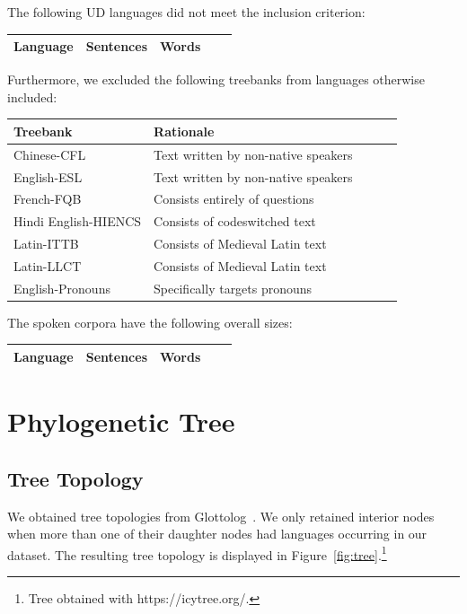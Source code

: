 \documentclass[11pt,a4paper]{article}
\begin{document}
The following UD languages did not meet the inclusion criterion:

\begin{longtable}{lllll}
Language & Sentences & Words \\ \hline
\end{longtable}


Furthermore, we excluded the following treebanks from languages otherwise included:

\begin{tabular}{lllll}
Treebank & Rationale \\ \hline
Chinese-CFL & Text written by non-native speakers\\
English-ESL & Text written by non-native speakers \\
French-FQB & Consists entirely of questions \\
Hindi English-HIENCS &  Consists of codeswitched text \\
Latin-ITTB & Consists of Medieval Latin text \\
Latin-LLCT & Consists of Medieval Latin text  \\
English-Pronouns & Specifically targets pronouns \\
\end{tabular}



The spoken corpora have the following overall sizes:

\begin{longtable}{lllll}
Language & Sentences & Words \\ \hline
\end{longtable}

\section{Phylogenetic Tree}

\subsection{Tree Topology}

We obtained tree topologies from Glottolog~\citep{nordhoff2011glottolog}.
We only retained interior nodes when more than one of their daughter nodes had languages occurring in our dataset.
The resulting tree topology is displayed in Figure~\ref{fig:tree}.\footnote{Tree obtained with https://icytree.org/.}
\end{document}

